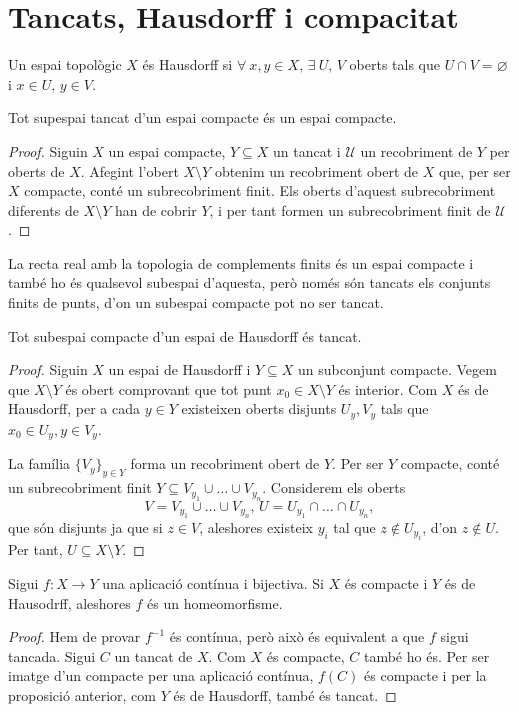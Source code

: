 \section{Tancats, Hausdorff i compacitat}

\begin{defi}
	Un espai topològic $X$ \'es Hausdorff si $\forall \: x, y \in X, \, \exists \: U,\, V$
	oberts tals que $U \cap V = \varnothing$ i $x \in U,\, y \in V$.
\end{defi}
\begin{prop}
	Tot supespai tancat d'un espai compacte \'es un espai compacte. 
\end{prop}
\begin{proof}
	Siguin $X$ un espai compacte, $Y \subseteq X$ un tancat i $\mathcal{U}$ un recobriment
	de $Y$ per oberts de $X$. Afegint l'obert $X \setminus Y$ obtenim un 
	recobriment obert de $X$ que, per ser $X$ compacte, cont\'e un 
	subrecobriment finit. Els oberts d'aquest subrecobriment diferents 
	de $X \setminus Y$  han de cobrir $Y$, i per tant formen un subrecobriment finit de 
	$\mathcal{U}$.
\end{proof}
\begin{example}
	La recta real amb la topologia de complements finits \'es un espai compacte i tamb\'e ho
	\'es qualsevol subespai d'aquesta, però nom\'es són tancats els conjunts finits de punts,
	d'on un subespai compacte pot no ser tancat.
\end{example}
\begin{prop}
	Tot subespai compacte d'un espai de Hausdorff \'es tancat.
\end{prop}
\begin{proof}
	Siguin $X$ un espai de Hausdorff i $Y \subseteq X$ un subconjunt compacte. Vegem que
	$X \setminus Y$ \'es obert comprovant que tot punt $x_0 \in X \setminus Y$ \'es interior. Com $X$
	\'es de Hausdorff, per a cada $y \in Y$ existeixen oberts disjunts $U_y, V_y$ tals
	que $x_0 \in U_y, y \in V_y$.

	La família $\{V_y\}_{y \in Y}$ forma un recobriment obert de $Y$. Per ser $Y$ compacte,
	cont\'e un subrecobriment finit $Y \subseteq V_{y_1} \cup \dots \cup V_{y_n}$.
	Considerem els oberts
	\[ 
		V = V_{y_1} \cup \dots \cup V_{y_n}, \,
		U = U_{y_1} \cap \dots \cap U_{y_n},
	\]
	que són disjunts ja que si $z \in V$, aleshores 
	existeix $y_i$ tal que $z \not\in U_{y_i}$,
	d'on $z \not\in U$. Per tant, $U \subseteq X \setminus Y$.
\end{proof}
\begin{prop}
	Sigui $f : X \longrightarrow Y$ una aplicació contínua i bijectiva. Si $X$ \'es compacte
	i $Y$ \'es de Hausodrff, aleshores $f$ \'es un homeomorfisme.
\end{prop}
\begin{proof}
	Hem de provar $f^{-1}$ \'es contínua, però això \'es equivalent a que $f$ sigui tancada. 
	Sigui $C$ un tancat de $X$. Com $X$ \'es compacte, $C$ tamb\'e ho \'es. Per ser imatge
	d'un compacte per una aplicació contínua, $f(C)$ \'es compacte i per la
	proposició anterior, com $Y$ \'es de Hausdorff, tamb\'e \'es tancat.
\end{proof}

